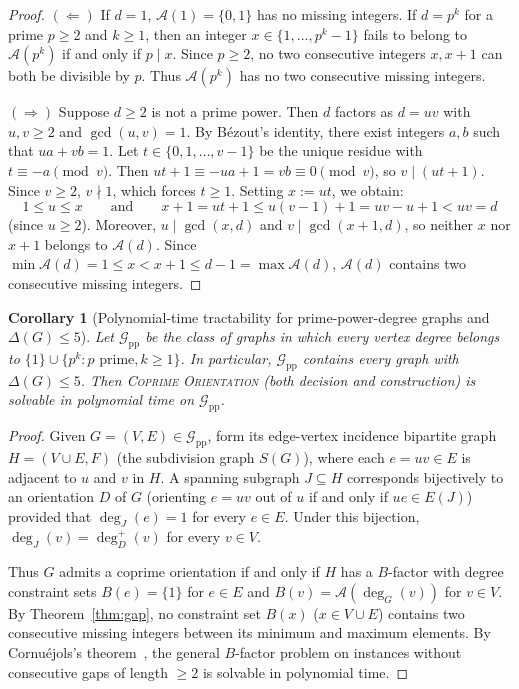 \documentclass[11pt,a4paper]{article}
\newtheorem{corollary}[theorem]{Corollary}
\theoremstyle{definition}
\theoremstyle{remark}
\newcommand{\outdeg}{\deg^{+}}
\newcommand{\Aset}{\mathcal{A}}
\begin{document}
\begin{proof}
$(\Leftarrow)$ If $d = 1$, $\Aset(1) = \{0, 1\}$ has no missing integers. If $d = p^k$ for a prime $p \ge 2$ and $k \ge 1$, then an integer $x \in \{1, \dots, p^k - 1\}$ fails to belong to $\Aset(p^k)$ if and only if $p \mid x$. Since $p \ge 2$, no two consecutive integers $x, x + 1$ can both be divisible by $p$. Thus $\Aset(p^k)$ has no two consecutive missing integers.

$(\Rightarrow)$ Suppose $d \ge 2$ is not a prime power. Then $d$ factors as $d = uv$ with $u, v \ge 2$ and $\gcd(u, v) = 1$. By B\'ezout's identity, there exist integers $a, b$ such that $ua + vb = 1$. Let $t \in \{0, 1, \dots, v - 1\}$ be the unique residue with $t \equiv -a \pmod{v}$. Then $ut + 1 \equiv -ua + 1 = vb \equiv 0 \pmod{v}$, so $v \mid (ut + 1)$. Since $v \ge 2$, $v \nmid 1$, which forces $t \ge 1$. Setting $x := ut$, we obtain:
\[
  1 \le u \le x \qquad\text{and}\qquad x + 1 = ut + 1 \le u(v - 1) + 1 = uv - u + 1 < uv = d
\]
(since $u \ge 2$). Moreover, $u \mid \gcd(x, d)$ and $v \mid \gcd(x + 1, d)$, so neither $x$ nor $x + 1$ belongs to $\Aset(d)$. Since $\min \Aset(d) = 1 \le x < x + 1 \le d - 1 = \max \Aset(d)$, $\Aset(d)$ contains two consecutive missing integers.
\end{proof}

\begin{corollary}[Polynomial-time tractability for prime-power-degree graphs and $\Delta(G) \le 5$]\label{cor:poly}
Let $\mathcal{G}_{\mathrm{pp}}$ be the class of graphs in which every vertex degree belongs to $\{1\} \cup \{p^k : p \text{ prime}, k \ge 1\}$. In particular, $\mathcal{G}_{\mathrm{pp}}$ contains every graph with $\Delta(G) \le 5$. Then \textsc{Coprime Orientation} (both decision and construction) is solvable in polynomial time on $\mathcal{G}_{\mathrm{pp}}$.
\end{corollary}

\begin{proof}
Given $G = (V, E) \in \mathcal{G}_{\mathrm{pp}}$, form its edge-vertex incidence bipartite graph $H = (V \cup E, F)$ (the subdivision graph $S(G)$), where each $e = uv \in E$ is adjacent to $u$ and $v$ in $H$. A spanning subgraph $J \subseteq H$ corresponds bijectively to an orientation $D$ of $G$ (orienting $e = uv$ out of $u$ if and only if $ue \in E(J)$) provided that $\deg_J(e) = 1$ for every $e \in E$. Under this bijection, $\deg_J(v) = \outdeg_D(v)$ for every $v \in V$.

Thus $G$ admits a coprime orientation if and only if $H$ has a $B$-factor with degree constraint sets $B(e) = \{1\}$ for $e \in E$ and $B(v) = \Aset(\deg_G(v))$ for $v \in V$. By Theorem~\ref{thm:gap}, no constraint set $B(x)$ ($x \in V \cup E$) contains two consecutive missing integers between its minimum and maximum elements. By Cornu\'ejols's theorem~\cite{Cornuejols1988}, the general $B$-factor problem on instances without consecutive gaps of length $\ge 2$ is solvable in polynomial time.
\end{proof}
\end{document}
